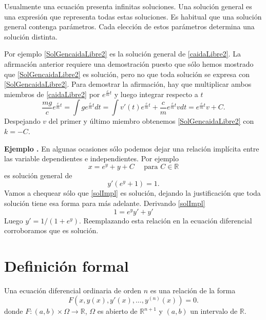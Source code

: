 \documentclass{article}
\newcommand{\rr}{\mathbb{R}}
\newcounter{ejemplo_cont}
\newenvironment{ejemplo}{\noindent\textbf{Ejemplo  \arabic{ejemplo_cont}.} }{\addtocounter{ejemplo_cont}{1}}
\begin{document}
\begin{definicion} Usualmente una ecuación presenta infinitas soluciones. Una solución general  es una expresión que representa todas estas soluciones. Es habitual que una solución general contenga parámetros. Cada elección de estos parámetros determina una solución distinta.
 \end{definicion}

 Por ejemplo \eqref{SolGencaidaLibre2} es la solución general de \eqref{caidaLibre2}.
  La afirmación anterior requiere una demostración puesto que sólo hemos mostrado que \eqref{SolGencaidaLibre2} es solución, pero no
que toda solución se expresa con \eqref{SolGencaidaLibre2}. Para demostrar la afirmación, hay que multiplicar ambos miembros de \eqref{caidaLibre2} 
por $e^{\frac{c}{m}t}$ y luego integrar respecto a $t$ 
\[\frac{mg}{c}e^{\frac{c}{m}t}=\int ge^{\frac{c}{m}t}dt=\int v'(t)e^{\frac{c}{m}t}+\frac{c}{m}e^{\frac{c}{m}t} vdt=e^{\frac{c}{m}t}v+C.\]
 Despejando $v$ del primer y último miembro obtenemos \eqref{SolGencaidaLibre2} con $k=-C$.

 




\begin{ejemplo} En algunas ocasiones sólo podemos dejar una relación implícita entre las variable dependientes e independientes. Por ejemplo
\begin{equation}\label{solImpl}x=e^y+y+C\quad\text{ para } C\in\rr\end{equation}
es solución general de
\[y'(e^y+1)=1.\]
Vamos a chequear sólo que \eqref{solImpl} es solución, dejando la justificación que toda solución tiene esa forma para más adelante. Derivando \eqref{solImpl}
\[ 1=e^yy'+y'\]
Luego $y'=1/(1+e^{y})$. Reemplazando esta relación  en la ecuación diferencial corroboramos que es solución.
\end{ejemplo}



\section{Definición formal}

\begin{definicion} Una ecuación diferencial ordinaria de orden $n$ es una relación de la forma
\[\boxed{F(x,y(x),y'(x),\ldots,y^{(n)}(x))=0}.\]
donde $F:(a,b)\times \Omega\to\rr$, $\Omega$ es abierto de $\rr^{n+1}$ y $(a,b)$ un intervalo de $\rr$.
  \end{definicion}
\end{document}
